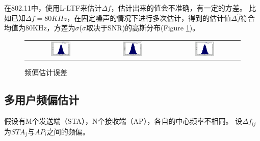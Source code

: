 在802.11中，使用L-LTF来估计$\Delta f$，估计出来的值会不准确，有一定的方差。
比如已知$\Delta f = 80 KHz$，在固定噪声的情况下进行多次估计，得到的估计值$\Delta \hat{f}$符合均值为80KHz，方差为$\sigma$($\sigma$取决于SNR)的高斯分布(Figure \ref{fig:cfovar})。
\begin{figure}
	\centering
	\begin{tabular}{ccc}
		\includegraphics[width=0.3\textwidth]{SimCFO1.png} &
		\includegraphics[width=0.3\textwidth]{SimCFO2.png} &
		\includegraphics[width=0.3\textwidth]{SimCFO3.png}
	\end{tabular}
	\caption{频偏估计误差}\label{fig:cfovar}
\end{figure}


%
\subsection{多用户频偏估计}
假设有M个发送端（STA），N个接收端（AP），各自的中心频率不相同。
设$\Delta f_{ij}$为$STA_{j}$与$AP_{i}$之间的频偏。

